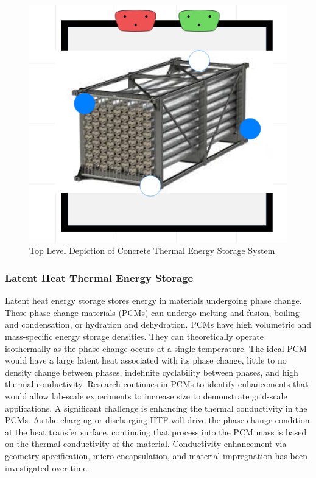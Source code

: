 \begin{figure}[hbtp]
\centering
\includegraphics[scale=0.8]{pics/CTES.png}
\caption{Top Level Depiction of Concrete Thermal Energy Storage System}
\label{CTES}
\end{figure}

%

\subsubsection{Latent Heat Thermal Energy Storage}

Latent heat energy storage stores energy in materials undergoing phase change. These phase change materials (PCMs) can undergo melting and fusion, boiling and condensation, or hydration and dehydration. PCMs have high volumetric and mass-specific energy storage densities. They can theoretically operate isothermally as the phase change occurs at a single temperature. The ideal PCM would have a large latent heat associated with its phase change, little to no density change between phases, indefinite cyclability between phases, and high thermal conductivity. Research continues in PCMs to identify enhancements that would allow lab-scale experiments to increase size to demonstrate grid-scale applications. A significant challenge is enhancing the thermal conductivity in the PCMs. As the charging or discharging HTF will drive the phase change condition at the heat transfer surface, continuing that process into the PCM mass is based on the thermal conductivity of the material. Conductivity enhancement via geometry specification, micro-encapsulation, and material impregnation has been investigated over time. 

